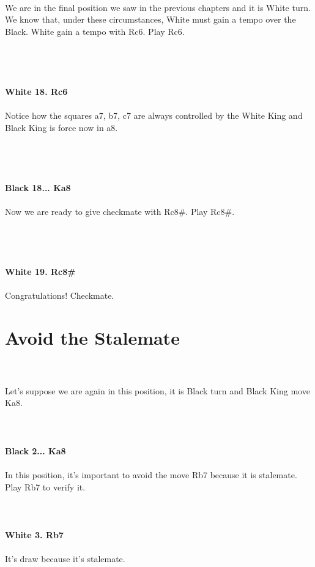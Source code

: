 \documentclass{article}
\begin{document}
\\
We are in the final position we saw in the previous chapters and it is White turn. We know that, under these circumstances, White must gain a tempo over the Black. White gain a tempo with Rc6. Play Rc6.\\\\
\\

\\
\\
\textbf{White 18. Rc6}\\
\\
Notice how the squares a7, b7, c7 are always controlled by the White King and Black King is force now in a8.\\\\
\\

\\
\\
\textbf{Black 18... Ka8}\\
\\
Now we are ready to give checkmate with Rc8\#. Play Rc8\#.\\\\
\\

\\
\\
\textbf{White 19. Rc8\#}\\
\\
Congratulations! Checkmate.\section{ Avoid the Stalemate}

\\
\\
Let's suppose we are again in this position, it is Black turn and Black King move Ka8.\\
\\

\\
\\
\textbf{Black 2... Ka8}\\
\\
In this position, it's important to avoid the move Rb7 because it is stalemate. Play Rb7 to verify it.\\
\\

\\
\\
\textbf{White 3. Rb7}\\
\\
It's draw because it's stalemate.
\end{document}
